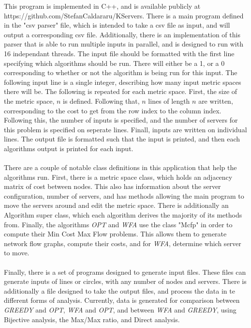 This program is implemented in C++, and is available publicly at https://github.com/StefanCaldararu/KServers. There is a main program defined in the "csv parser" file, which is intended to take a csv file as input, and will output a corresponding csv file. Additionally, there is an implementation of this parser that is able to run multiple inputs in parallel, and is designed to run with 16 independant threads. The input file should be formatted with the first line specifying which algorithms should be run. There will either be a 1, or a 0 corresponding to whether or not the algorithm is being run for this input. The following input line is a single integer, describing how many input metric spaces there will be. The following is repeated for each metric space. First, the size of the metric space, $n$ is defined. Following that, $n$ lines of length $n$ are written, corresponding to the cost to get from the row index to the column index. Following this, the number of inputs is specified, and the number of servers for this problem is specified on seperate lines. Finall, inputs are written on individual lines. The output file is formatted such that the input is printed, and then each algorithms output is printed for each input.
\\ \\
There are a couple of notable class definitions in this application that help the algorithms run. First, there is a metric space class, which holds an adjacency matrix of cost between nodes. This also has information about the server configuration, number of servers, and has methods allowing the main program to move the servers around and edit the metric space. There is additionally an Algorithm super class, which each algorithm derives the majority of its methods from. Finally, the algorithms \textit{OPT} and \textit{WFA} use the class "Mcfp" in order to compute their Min Cost Max Flow problems. This allows them to generate network flow graphs, compute their costs, and for \textit{WFA}, determine which server to move.
\\ \\
Finally, there is a set of programs designed to generate input files. These files can generate inputs of lines or circles, with any number of nodes and servers. There is additionally a file designed to take the output files, and process the data in te different forms of analysis. Currently, data is generated for comparison between \textit{GREEDY} and \textit{OPT}, \textit{WFA} and \textit{OPT}, and between \textit{WFA} and \textit{GREEDY}, using Bijective analysis, the Max/Max ratio, and Direct analysis.